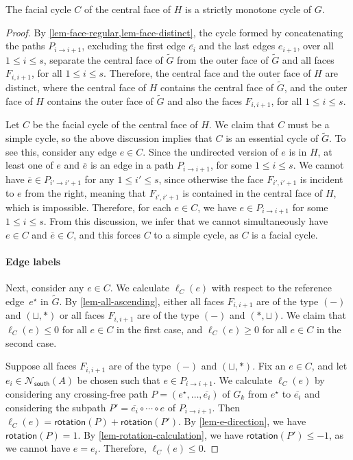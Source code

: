 \documentclass{article}\usepackage[a4paper,margin=20mm]{geometry}
\newcommand{\Nsouth}{\mathcal{N}_\mathsf{south}}
\newcommand{\rotation}{\mathsf{rotation}}
\newcommand{\eref}{e^\star}
\begin{document}
\begin{lemma}\label{lem-central-face}
The facial cycle $C$ of the central face of $H$ is a strictly monotone cycle of $G$.
\end{lemma}
\begin{proof}
By \cref{lem-face-regular,lem-face-distinct}, the cycle formed by concatenating the paths $P_{i \rightarrow i+1}$, excluding the first edge $\overline{e_i}$ and the last edges $e_{i+1}$, over all $1 \leq i \leq s$, separate the central face of $\tilde{G}$ from the outer face of $\tilde{G}$ and all faces $F_{i,i+1}$, for all $1 \leq i \leq s$.
Therefore, the central face and the outer face of $H$ are distinct, where the central face of $H$ contains the central face of $\tilde{G}$, and the outer face of $H$ contains the outer face of $\tilde{G}$ and also the faces $F_{i,i+1}$, for all $1 \leq i \leq s$. 

Let $C$ be the facial cycle of the central face of $H$.  We claim that $C$ must be a simple cycle, so the above discussion implies that $C$ is an essential cycle of $\tilde{G}$. To see this, consider any edge $e \in C$. Since the undirected version of $e$ is in $H$, at least one of $e$ and $\overline{e}$ is an edge in a path $P_{i \rightarrow i+1}$, for some $1 \leq i \leq s$.
We cannot have $\overline{e} \in P_{i' \rightarrow i'+1}$ for any $1 \leq i' \leq s$, since otherwise the face $F_{i',i'+1}$ is incident to $e$ from the right, meaning that $F_{i',i'+1}$ is contained in the central face of $H$, which is impossible. Therefore, for each $e \in C$, we have $e \in P_{i \rightarrow i+1}$ for some $1 \leq i \leq s$. From this discussion, we infer that we cannot simultaneously have $e \in C$ and $\overline{e} \in C$, and this forces $C$ to a simple cycle, as $C$ is a facial cycle. 

\paragraph{Edge labels}
Next, consider any $e \in C$. We calculate $\ell_C(e)$ with respect to the reference edge~$\eref$ in $\tilde{G}$.
By \cref{lem-all-ascending}, either all faces $F_{i,i+1}$ are of the type $(-)$ and $(\sqcup,\ast)$ or all faces $F_{i,i+1}$ are of the type $(-)$ and $(\ast,\sqcup)$. We claim that $\ell_C(e) \leq 0$ for all $e \in C$ in the first case, and $\ell_C(e) \geq 0$ for all $e \in C$ in the second case. 

Suppose all faces $F_{i,i+1}$ are of the type $(-)$ and $(\sqcup,\ast)$.
Fix an $e \in C$, and let $e_i \in \Nsouth(A)$ be chosen such that $e \in P_{i \rightarrow i+1}$. 
We calculate $\ell_C(e)$ by considering any crossing-free path $P=(\eref, \ldots, \overline{e_i})$ of $G_k$ from $\eref$ to $\overline{e_i}$ and considering the subpath $P'=\overline{e_i} \circ \cdots \circ e$ of $P_{i \rightarrow i+1}$. Then $\ell_C(e) = \rotation(P) + \rotation(P')$. By \cref{lem-e-direction}, we have $\rotation(P)=1$. By \cref{lem-rotation-calculation}, we have $\rotation(P') \leq -1$, as we cannot have $e = e_i$.
Therefore, $\ell_C(e) \leq 0$.


\end{proof}
\end{document}
